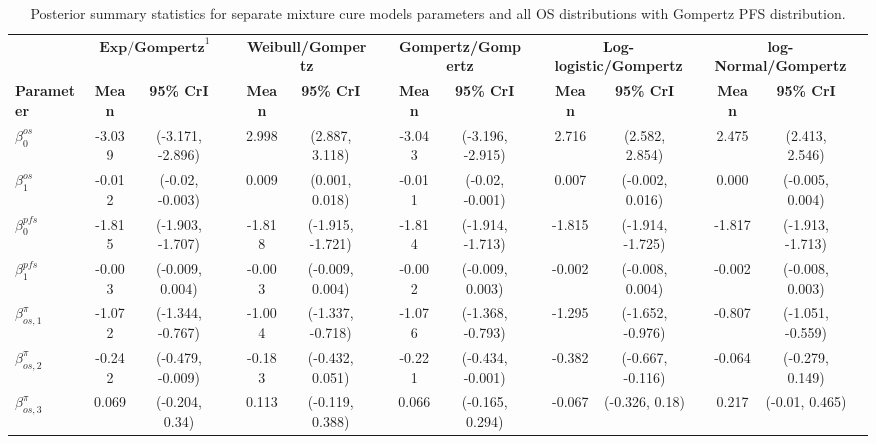 \documentclass[AMA,STIX1COL]{WileyNJD-v2}
\begin{document}
\begin{landscape}
\begin{center}
\begin{table}[t]
\caption{Posterior summary statistics for separate mixture cure models parameters and all OS distributions with Gompertz PFS distribution. \label{tab:post_sep_pfs_gompertz}}
\centering
\begin{tabular}{l c c c c c c c c c c c c c c c}
\toprule
\multicolumn{1}{l}{} & \multicolumn{2}{c}{$\textbf{Exp/Gompertz}^1$} & & \multicolumn{2}{c}{\textbf{Weibull/Gompertz}} & & \multicolumn{2}{c}{\textbf{Gompertz/Gompertz}} & & \multicolumn{2}{c}{\textbf{Log-logistic/Gompertz}} & & \multicolumn{2}{c}{\textbf{log-Normal/Gompertz}}\\
\cmidrule{2-3}\cmidrule{5-6}\cmidrule{8-9}\cmidrule{11-12}\cmidrule{14-15}
\textbf{Parameter} & \textbf{Mean} & \textbf{95\% CrI} & & \textbf{Mean} & \textbf{95\% CrI} & & \textbf{Mean} & \textbf{95\% CrI} & & \textbf{Mean} & \textbf{95\% CrI} & & \textbf{Mean} & \textbf{95\% CrI}\\
\midrule
$\beta^{os}_0$ & -3.039 & (-3.171, -2.896) &  & 2.998 & (2.887, 3.118) &  & -3.043 & (-3.196, -2.915) &  & 2.716 & (2.582, 2.854) &  & 2.475 & (2.413, 2.546) & \\
$\beta^{os}_1$ & -0.012 & (-0.02, -0.003) &  & 0.009 & (0.001, 0.018) &  & -0.011 & (-0.02, -0.001) &  & 0.007 & (-0.002, 0.016) &  & 0.000 & (-0.005, 0.004) & \\
$\beta^{pfs}_0$ & -1.815 & (-1.903, -1.707) &  & -1.818 & (-1.915, -1.721) &  & -1.814 & (-1.914, -1.713) &  & -1.815 & (-1.914, -1.725) &  & -1.817 & (-1.913, -1.713) & \\
$\beta^{pfs}_1$ & -0.003 & (-0.009, 0.004) &  & -0.003 & (-0.009, 0.004) &  & -0.002 & (-0.009, 0.003) &  & -0.002 & (-0.008, 0.004) &  & -0.002 & (-0.008, 0.003) & \\
$\beta^{\pi}_{os, 1}$ & -1.072 & (-1.344, -0.767) &  & -1.004 & (-1.337, -0.718) &  & -1.076 & (-1.368, -0.793) &  & -1.295 & (-1.652, -0.976) &  & -0.807 & (-1.051, -0.559) & \\
$\beta^{\pi}_{os, 2}$ & -0.242 & (-0.479, -0.009) &  & -0.183 & (-0.432, 0.051) &  & -0.221 & (-0.434, -0.001) &  & -0.382 & (-0.667, -0.116) &  & -0.064 & (-0.279, 0.149) & \\
$\beta^{\pi}_{os, 3}$ & 0.069 & (-0.204, 0.34) &  & 0.113 & (-0.119, 0.388) &  & 0.066 & (-0.165, 0.294) &  & -0.067 & (-0.326, 0.18) &  & 0.217 & (-0.01, 0.465) & \\

\end{tabular}
\end{table}
\end{center}
\end{landscape}
\end{document}
